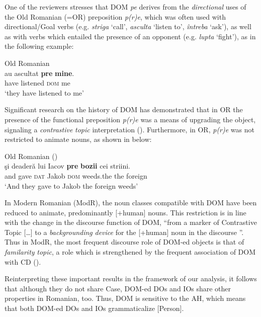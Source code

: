 \documentclass[output=paper,colorlinks,citecolor=brown,nonflat]{./langscibook}
\begin{document}
One of the reviewers stresses that DOM \textit{pe} derives from the \textit{directional} uses of the Old Romanian (=OR) preposition \textit{p(r)e}, which was often used with directional/Goal verbs (e.g. \textit{striga} ‘call’, \textit{asculta} ‘listen to’, \textit{întreba} ‘ask’), as well as with verbs which entailed the presence of an opponent (e.g. \textit{lupta} ‘fight’), as in the following example: 

\ea%
      \label{ex:cornilescu:19}
      Old Romanian \citep[395]{HillMardale2017}\\
      \gll au  ascultat	\textbf{pre} \textbf{mine}.\\
            have listened \textsc{dom} me\\
      \glt ‘they have listened to me’
      \z



Significant research on the history of DOM has demonstrated that in OR the presence of the functional preposition \textit{p(r)e} was a means of upgrading the object, signaling a \textit{contrastive} \textit{topic} interpretation (\citealt{Hill2013, HillMardale2017}). Furthermore, in OR, \textit{p(r)e} was not restricted to animate nouns, as shown in  below:

\ea%
      \label{ex:cornilescu:20}
      Old Romanian  (\citealt[396]{HillMardale2017}) \\
      \gll  şi deaderă lui Iacov \textbf{pre} \textbf{bozii} cei striini.\\
             and gave \textsc{dat} Jakob \textsc{dom} weeds.the the foreign\\
      \glt ‘And they gave to Jakob the foreign weeds’
      \z

In Modern Romanian (ModR), the noun classes compatible with DOM have been reduced to animate, predominantly [+human] nouns. This restriction is in line with the change in the discourse function of DOM, “from a marker of Contrastive Topic […] to a \textit{backgrounding} \textit{device} for the [+human] noun in the discourse \citep[147]{Hill2013}”. Thus in ModR, the most frequent discourse role of DOM-ed objects is that of \textit{familarity} \textit{topic}, a role which is strengthened by the frequent association of DOM with CD (\citealt{HillMardale2017}).

Reinterpreting these important results in the framework of our analysis, it follows that although they do not share Case, DOM-ed DOs and IOs share other properties in Romanian, too. Thus, DOM is sensitive to the AH, which means that both DOM-ed DOs and IOs grammaticalize [Person].
\end{document}
